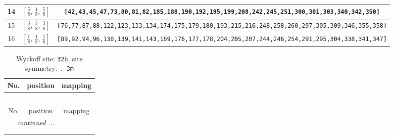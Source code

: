 \documentclass[fleqn,8pt]{jsarticle}
\begin{document}
\begin{longtable}{ccc}
14 & $\left[ \frac{5}{8},\, \frac{1}{8},\, \frac{5}{8} \right]$ & {\tt [42,43,45,47,73,80,81,82,185,188,190,192,195,199,208,242,245,251,300,301,303,340,342,350]} \\ \hline
15 & $\left[ \frac{3}{8},\, \frac{3}{8},\, \frac{3}{8} \right]$ & {\tt [76,77,87,88,122,123,133,134,174,175,179,180,193,215,216,248,258,260,297,305,309,346,355,358]} \\ \hline
16 & $\left[ \frac{1}{8},\, \frac{1}{8},\, \frac{1}{8} \right]$ & {\tt [89,92,94,96,138,139,141,143,169,176,177,178,204,205,207,244,246,254,291,295,304,338,341,347]} \\
\end{longtable}
\renewcommand{\arraystretch}{1.2}
\begin{longtable}{ccc}
\caption{Wyckoff site: {\tt 32b}, site symmetry: {\tt .-3m}}
 \\
 \hline \hline
No. & position & mapping \\ \hline \endfirsthead

\multicolumn{2}{l}{\tablename\ \thetable{}} \\
 \hline \hline
No. & position & mapping \\ \hline \endhead

 \hline \hline
\multicolumn{2}{r}{\footnotesize\it continued ...} \\ \endfoot

 \hline \hline
\multicolumn{2}{r}{} \\ \endlastfoot


\end{longtable}
\end{document}
